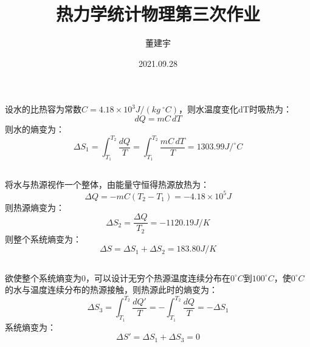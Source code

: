 \documentclass[a4paper,12pt]{article}
\title{热力学统计物理第三次作业}
\date{2021.09.28}
\author{董建宇}
\begin{document}
\maketitle

\titleformat{\section}[hang]{\small}{\thesection}{0.8em}{}{}
\titleformat{\subsection}[hang]{\small}{\thesubsection}{0.8em}{}{}

\section{}
\subsection{}
设水的比热容为常数$C=4.18\times 10^{3}J/(kg~^{\circ}C)$，则水温度变化dT时吸热为：
\begin{equation}\nonumber
	dQ=mC\,dT
\end{equation}
则水的熵变为：
\begin{equation}\nonumber
	\Delta S_1=\int_{T_1}^{T_2}\frac{dQ}{T}=\int_{T_1}^{T_2}\frac{mC\,dT}{T}=1303.99 J/^{\circ}C
\end{equation}
\subsection{}
将水与热源视作一个整体，由能量守恒得热源放热为：
\begin{equation}\nonumber
	\Delta Q=-mC(T_2-T_1)=-4.18\times 10^{5}J
\end{equation}
则热源熵变为：
\begin{equation}\nonumber
	\Delta S_2=\frac{\Delta Q}{T_2}=-1120.19 J/K
\end{equation}
则整个系统熵变为：
\begin{equation}\nonumber
	\Delta S=\Delta S_1+\Delta S_2=183.80 J/K
\end{equation}
\subsection{}
欲使整个系统熵变为0，可以设计无穷个热源温度连续分布在$0^{\circ}C$到$100^{\circ}C$，使$0^{\circ}C$的水与温度连续分布的热源接触，则热源此时的熵变为：
\begin{equation}\nonumber
	\Delta S_3=\int_{T_1}^{T_2}\frac{dQ'}{T}=-\int_{T_1}^{T_2}\frac{dQ}{T}=-\Delta S_1
\end{equation}
系统熵变为：
\begin{equation}\nonumber
	\Delta S'=\Delta S_1+\Delta S_3=0
\end{equation}
\end{document}
